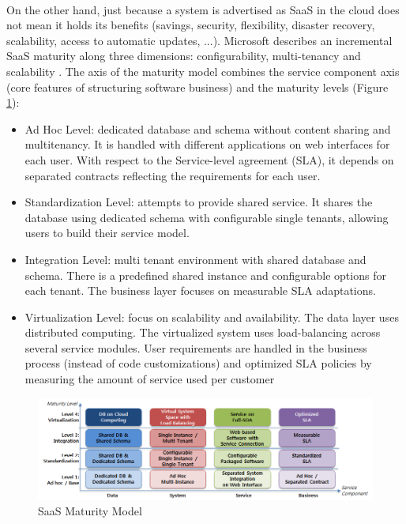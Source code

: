 \documentclass[11pt,english]{article} %
\begin{document}
\


On the other hand, just because a system is advertised as SaaS in the cloud does not mean it holds its benefits (savings, security, flexibility, disaster recovery, scalability, access to automatic updates, ...). %
Microsoft describes an incremental SaaS maturity along three dimensions: configurability, multi-tenancy and scalability \cite{saas-maturity-model}. 
The axis of the maturity model combines the service component axis (core features of structuring software business) and the maturity levels (Figure \ref{fig:saas-maturity-model}):
\begin{itemize}
    \item Ad Hoc Level: dedicated database and schema without content sharing and multitenancy. It is handled with different applications on web interfaces for each user. With respect to the Service-level agreement (SLA), it depends on separated contracts reflecting the requirements for each user.
    \item Standardization Level: attempts to provide shared service. It shares the database using dedicated schema with configurable single tenants, allowing users to build their service model.
    \item Integration Level: multi tenant environment with shared database and schema. There is a predefined shared instance and configurable options for each tenant. The business layer focuses on measurable SLA adaptations.
    \item Virtualization Level: focus on scalability and availability.
    The data layer uses distributed computing.
    The virtualized system uses load-balancing across several service modules.
    User requirements are handled in the business process (instead of code customizations) and optimized SLA policies by measuring the amount of service used per customer
\end{itemize} 

\begin{figure}[H]
  \centering
  \includegraphics[scale=0.5]{img/saas-maturity-model.png}
  \caption{SaaS Maturity Model \cite{saas-maturity-model}}
  \label{fig:saas-maturity-model}
\end{figure}
\end{document}
